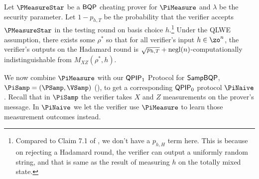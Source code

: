 \begin{lemma}
	\label{lem:urmila-binding}
	Let $\PMeasureStar$ be a $\operatorname{\mathsf{BQP}}$ cheating  prover for $\PiMeasure$ and $\lambda$ be the security parameter. Let $1-p_{h,T}$ be the  probability that the verifier accepts $\PMeasureStar$ in the testing round on basis choice $h$.\footnote{Compared to Claim 7.1 of \cite{FOCS:Mahadev18a}, we don't have a $p_{h,H}$ term here. This is because on rejecting a Hadamard round, the verifier can output a uniformly random string, and that is same as the result of measuring $h$ on the totally mixed state.} Under the QLWE assumption, there exists some $\rho^*$ so that for all verifier's input $h \in \zo^n$, the verifier's outputs on the Hadamard round is $\sqrt{p_{h,T}}+\operatorname{negl}(n)$-computationally indistinguishable from $M_{XZ}(\rho^*, h)$.
\end{lemma}

We now combine $\PiMeasure$ with our $\operatorname{\mathsf{QPIP}}_1$ Protocol for $\operatorname{\mathsf{SampBQP}}$, $\PiSamp=(\PSamp, \VSamp)$ (), to get a corresponding $\operatorname{\mathsf{QPIP}}_0$ protocol $\PiNaive$.
Recall that in $\PiSamp$ the verifier takes $X$ and $Z$ measurements on the prover's message.
In $\PiNaive$ we let the verifier use $\PiMeasure$ to learn those measurement outcomes instead.

